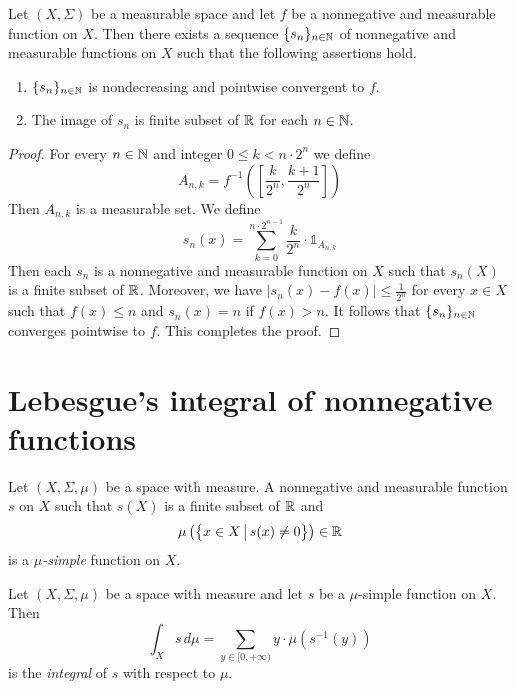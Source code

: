 \documentclass[10pt]{amsart}
\begin{document}
\begin{proposition}\label{proposition:simple_approximation_for_nonnegative}
	Let $(X,\Sigma)$ be a measurable space and let $f$ be a nonnegative and measurable function on $X$. Then there exists a sequence $\{s_n\}_{n\in {\mathbb N}}$ of nonnegative and measurable functions on $X$ such that the following assertions hold.
	\begin{enumerate}[label=\emph{\textbf{(\arabic*)}}, leftmargin=*]
		\item $\{s_n\}_{n\in {\mathbb N}}$ is nondecreasing and pointwise convergent to $f$.
		\item The image of $s_n$ is finite subset of ${\mathbb R}$ for each $n\in {\mathbb N}$.
	\end{enumerate}
\end{proposition}
\begin{proof}
	For every $n\in {\mathbb N}$ and integer $0 \leq k < n\cdot 2^n$ we define
	$$A_{n,k}=f^{-1}\left(\left[\frac{k}{2^n},\frac{k+1}{2^n}\right]\right)$$
	Then $A_{n,k}$ is a measurable set. We define
	$$s_n(x)=\sum_{k=0}^{n\cdot 2^{n-1}}\frac{k}{2^n}\cdot \mathbb{1}_{A_{n,k}}$$
	Then each $s_n$ is a nonnegative and measurable function on $X$ such that $s_n(X)$ is a finite subset of ${\mathbb R}$. Moreover, we have $|s_n(x) - f(x)| \leq \frac{1}{2^n}$ for every $x \in X$ such that $f(x) \leq n$ and $s_n(x) = n$ if $f(x) > n$. It follows that $\{s_n\}_{n \in {\mathbb N}}$ converges pointwise to $f$. This completes the proof.
\end{proof}

\section{Lebesgue's integral of nonnegative functions}\label{section:lebesgues_integration}

\begin{definition}
	Let $(X,\Sigma,\mu)$ be a space with measure. A nonnegative and measurable function $s$ on $X$ such that $s(X)$ is a finite subset of ${\mathbb R}$ and
	$$\mu\left(\big\{x\in X\,\big|\,s(x)\neq 0\big\}\right) \in {\mathbb R}$$
	is a \textit{$\mu$-simple} function on $X$.
\end{definition}

\begin{definition}
	Let $(X,\Sigma,\mu)$ be a space with measure and let $s$ be a $\mu$-simple function on $X$. Then
	$$\int_Xs\,d\mu = \sum_{y\in [0,+\infty)}y\cdot \mu\left(s^{-1}(y)\right)$$
	is the \textit{integral} of $s$ with respect to $\mu$.
\end{definition}
\end{document}
